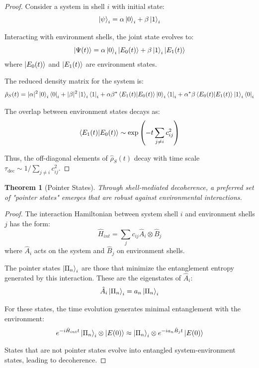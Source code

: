 \documentclass[12pt,a4paper]{article}
\newtheorem{theorem}{Theorem}[section]
\begin{document}
\begin{proof}
Consider a system in shell $i$ with initial state:
\begin{equation}
\ket{\psi}_i = \alpha\ket{0}_i + \beta\ket{1}_i
\end{equation}

Interacting with environment shells, the joint state evolves to:
\begin{equation}
\ket{\Psi(t)} = \alpha\ket{0}_i\ket{E_0(t)} + \beta\ket{1}_i\ket{E_1(t)}
\end{equation}
where $\ket{E_0(t)}$ and $\ket{E_1(t)}$ are environment states.

The reduced density matrix for the system is:
\begin{equation}
\hat{\rho}_S(t) = |\alpha|^2 \ket{0}_i\bra{0}_i + |\beta|^2 \ket{1}_i\bra{1}_i + \alpha\beta^* \braket{E_1(t)}{E_0(t)} \ket{0}_i\bra{1}_i + \alpha^*\beta \braket{E_0(t)}{E_1(t)} \ket{1}_i\bra{0}_i
\end{equation}

The overlap between environment states decays as:
\begin{equation}
\braket{E_1(t)}{E_0(t)} \sim \exp\left(-t \sum_{j \neq i} c_{ij}^2\right)
\end{equation}

Thus, the off-diagonal elements of $\hat{\rho}_S(t)$ decay with time scale $\tau_{\text{dec}} \sim 1/\sum_{j \neq i} c_{ij}^2$.
\end{proof}

\begin{theorem}[Pointer States]
\label{thm:pointer-states}
Through shell-mediated decoherence, a preferred set of "pointer states" emerges that are robust against environmental interactions.
\end{theorem}

\begin{proof}
The interaction Hamiltonian between system shell $i$ and environment shells $j$ has the form:
\begin{equation}
\hat{H}_{int} = \sum_j c_{ij} \hat{A}_i \otimes \hat{B}_j
\end{equation}
where $\hat{A}_i$ acts on the system and $\hat{B}_j$ on environment shells.

The pointer states $\ket{\Pi_n}_i$ are those that minimize the entanglement entropy generated by this interaction. These are the eigenstates of $\hat{A}_i$:
\begin{equation}
\hat{A}_i \ket{\Pi_n}_i = a_n \ket{\Pi_n}_i
\end{equation}

For these states, the time evolution generates minimal entanglement with the environment:
\begin{equation}
e^{-i\hat{H}_{int}t} \ket{\Pi_n}_i \otimes \ket{E(0)} \approx \ket{\Pi_n}_i \otimes e^{-ia_n\hat{B}_jt} \ket{E(0)}
\end{equation}

States that are not pointer states evolve into entangled system-environment states, leading to decoherence.
\end{proof}
\end{document}
